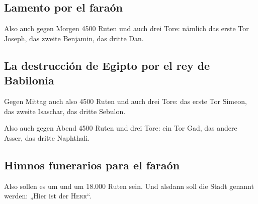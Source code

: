 \hypertarget{lamento-por-el-farauxf3n}{%
\subsection{Lamento por el faraón}\label{lamento-por-el-farauxf3n}}

 Also auch gegen Morgen 4500 Ruten und auch drei Tore:
nämlich das erste Tor Joseph, das zweite Benjamin, das dritte Dan.

\hypertarget{la-destrucciuxf3n-de-egipto-por-el-rey-de-babilonia}{%
\subsection{La destrucción de Egipto por el rey de
Babilonia}\label{la-destrucciuxf3n-de-egipto-por-el-rey-de-babilonia}}

 Gegen Mittag auch also 4500 Ruten und auch drei Tore:
das erste Tor Simeon, das zweite Isaschar, das dritte Sebulon.

 Also auch gegen Abend 4500 Ruten und drei Tore: ein Tor
Gad, das andere Asser, das dritte Naphthali.

\hypertarget{himnos-funerarios-para-el-farauxf3n}{%
\subsection{Himnos funerarios para el
faraón}\label{himnos-funerarios-para-el-farauxf3n}}

 Also sollen es um und um 18.000 Ruten sein. Und alsdann
soll die Stadt genannt werden: „Hier ist der \textsc{Herr}``.
